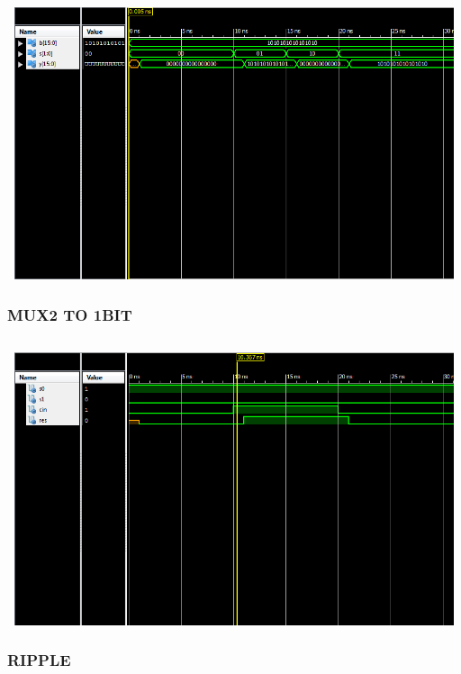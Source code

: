 \documentclass{article}
\begin{document}
\begin{lstlisting}

\end{lstlisting}
\includegraphics[width=16cm, height=8cm]{test_Blogic.png}
\pagebreak



\subsubsection{MUX2 TO 1BIT}\label{sec:result}

\begin{lstlisting}

\end{lstlisting}
\includegraphics[width=16cm, height=8cm]{test_mux2.png}
\pagebreak


\subsubsection{RIPPLE}\label{sec:result}
\end{document}
